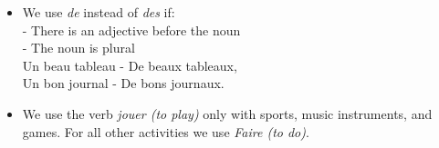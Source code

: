 \begin{itemize}
\item{We use \emph{de} instead of \emph{des} if:\\
- There is an adjective before the noun\\
- The noun is plural\\
Un beau tableau - De beaux tableaux,\\
Un bon journal - De bons journaux.}

\item{We use the verb \emph{jouer (to play)} only with sports, music instruments, and games.
For all other activities we use \emph{Faire (to do)}.}

\end{itemize}
